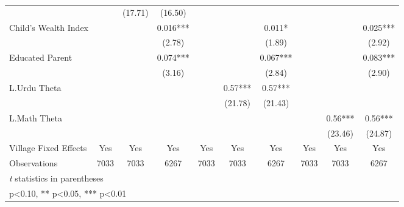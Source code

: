 \begin{sidewaystable}[htbp]
\begin{tabular}{l*{9}{c}}
                &            &  (17.71)   &  (16.50)   &            &            &            &            &            &            \\
Child's Wealth Index&            &            &    0.016***&            &            &    0.011*  &            &            &    0.025***\\
                &            &            &   (2.78)   &            &            &   (1.89)   &            &            &   (2.92)   \\
Educated Parent &            &            &    0.074***&            &            &    0.067***&            &            &    0.083***\\
                &            &            &   (3.16)   &            &            &   (2.84)   &            &            &   (2.90)   \\
L.Urdu Theta    &            &            &            &            &     0.57***&     0.57***&            &            &            \\
                &            &            &            &            &  (21.78)   &  (21.43)   &            &            &            \\
L.Math Theta    &            &            &            &            &            &            &            &     0.56***&     0.56***\\
                &            &            &            &            &            &            &            &  (23.46)   &  (24.87)   \\
Village Fixed Effects&      Yes   &      Yes   &      Yes   &      Yes   &      Yes   &      Yes   &      Yes   &      Yes   &      Yes   \\
\midrule
Observations    &     7033   &     7033   &     6267   &     7033   &     7033   &     6267   &     7033   &     7033   &     6267   \\
\bottomrule
\multicolumn{10}{l}{\footnotesize \textit{t} statistics in parentheses}\\
\multicolumn{10}{l}{\footnotesize * p<0.10, ** p<0.05, *** p<0.01}\\
\end{tabular}
\end{sidewaystable}
